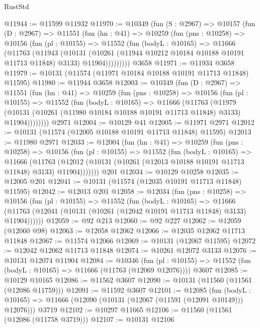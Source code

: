 \begin{lexlean}{RustStd}
\begin{coremodule}
@11944 := @11599 @11932
@11970 := @10349
    (fun (S : @2967) =>
    @10157
      (fun (D : @2967) =>
      @11551
        (fun (hn : @41) =>
        @10259
          (fun (pns : @10258) =>
          @10156
            (fun (pl : @10155) =>
            @11552
              (fun (bodyL : @10165) =>
              @11666
                (@11763
                  (@11943
                    (@10131
                      (@10261 (@11944 @10212 @10184 @10188 @10191 @11713 @11848) @3133)
                      @11904)))))))))
    @3658
@11971 := @11934 @3658
@11979 := @10131 (@11574 (@11971 @10184 @10188 @10191 @11713 @11848) @11595)
@11980 := @11944 @3658
@12003 := @10349
    (fun (D : @2967) =>
    @11551
      (fun (hn : @41) =>
      @10259
        (fun (pns : @10258) =>
        @10156
          (fun (pl : @10155) =>
          @11552
            (fun (bodyL : @10165) =>
            @11666
              (@11763
                (@11979
                  (@10131 (@10261 (@11980 @10184 @10188 @10191 @11713 @11848) @3133) @11904))))))))
    @2971
@12004 := @10129 @41
@12005 := @11971 @2971
@12012 := @10131 (@11574 (@12005 @10188 @10191 @11713 @11848) @11595)
@12013 := @11980 @2971
@12033 := @12004
    (fun (hn : @41) =>
    @10259
      (fun (pns : @10258) =>
      @10156
        (fun (pl : @10155) =>
        @11552
          (fun (bodyL : @10165) =>
          @11666
            (@11763
              (@12012 (@10131 (@10261 (@12013 @10188 @10191 @11713 @11848) @3133) @11904)))))))
    @201
@12034 := @10129 @10258
@12035 := @12005 @201
@12041 := @10131 (@11574 (@12035 @10191 @11713 @11848) @11595)
@12042 := @12013 @201
@12058 := @12034
    (fun (pns : @10258) =>
    @10156
      (fun (pl : @10155) =>
      @11552
        (fun (bodyL : @10165) =>
        @11666 (@11763 (@12041 (@10131 (@10261 (@12042 @10191 @11713 @11848) @3133) @11904))))))
@12059 := @92 @213
@12060 := @92 @227
@12062 := @12059 (@12060 @98)
@12063 := @12058 @12062
@12066 := @12035 @12062 @11713 @11848
@12067 := @11574 @12066
@12069 := @10131 (@12067 @11595)
@12072 := @12042 @12062 @11713 @11848
@12074 := @10261 @12072 @3133
@12076 := @10131 @12074 @11904
@12084 := @10346
    (fun (pl : @10155) => @11552 (fun (bodyL : @10165) => @11666 (@11763 (@12069 @12076))))
    @3607
@12085 := @10129 @10165
@12086 := @11562 @3607
@12090 := @10131 (@11560 (@11561 (@12086 @11759)))
@12091 := @11592 @3607
@12101 := @12085
    (fun (bodyL : @10165) => @11666 (@12090 (@10131 (@12067 (@11591 (@12091 @10149))) @12076)))
    @3719
@12102 := @10297 @11665
@12106 := @11560 (@11561 (@12086 (@11758 @3719)))
@12107 := @10131 @12106

\end{coremodule}
\end{lexlean}
